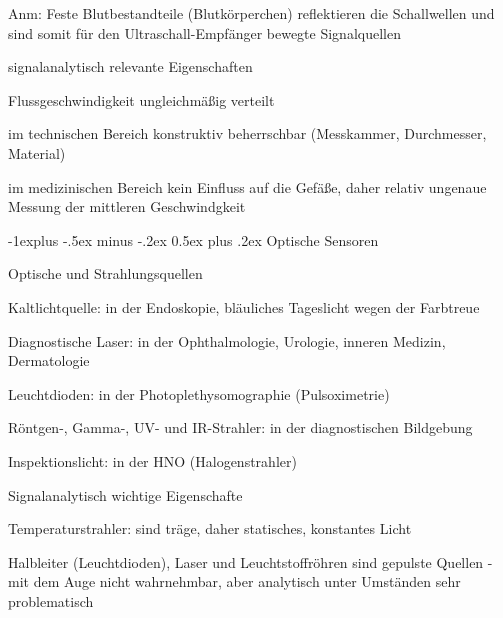 \documentclass[a4paper]{article}
\makeatletter
\renewcommand{\subsection}{\@startsection{subsection}{2}{0mm}%
 {-1explus -.5ex minus -.2ex}%
 {0.5ex plus .2ex}%
 {\normalfont\normalsize\bfseries}}
\makeatother
\begin{document}
\begin{multicols}{3}
\begin{itemize*}
\begin{itemize*}
      \item Anm: Feste Blutbestandteile (Blutkörperchen) reflektieren die Schallwellen und sind somit für den Ultraschall-Empfänger bewegte Signalquellen
    \end{itemize*}
    \item signalanalytisch relevante Eigenschaften
    \begin{itemize*}
      \item Flussgeschwindigkeit ungleichmäßig verteilt
      \item im technischen Bereich konstruktiv beherrschbar (Messkammer, Durchmesser, Material)
      \item im medizinischen Bereich kein Einfluss auf die Gefäße, daher relativ ungenaue Messung der mittleren Geschwindgkeit
    \end{itemize*}
  \end{itemize*}

  \subsection{Optische Sensoren}\label{optische-sensoren}

  Optische und Strahlungsquellen

  \begin{itemize*}
    \item Kaltlichtquelle: in der Endoskopie, bläuliches Tageslicht wegen der Farbtreue
    \item Diagnostische Laser: in der Ophthalmologie, Urologie, inneren Medizin, Dermatologie
    \item Leuchtdioden: in der Photoplethysomographie (Pulsoximetrie)
    \item Röntgen-, Gamma-, UV- und IR-Strahler: in der diagnostischen Bildgebung
    \item Inspektionslicht: in der HNO (Halogenstrahler)
  \end{itemize*}

  Signalanalytisch wichtige Eigenschafte

  \begin{itemize*}
    \item Temperaturstrahler: sind träge, daher statisches, konstantes Licht
    \item Halbleiter (Leuchtdioden), Laser und Leuchtstoffröhren sind gepulste Quellen - mit dem Auge nicht wahrnehmbar, aber analytisch unter Umständen sehr problematisch
  \end{itemize*}


\end{multicols}
\end{document}
